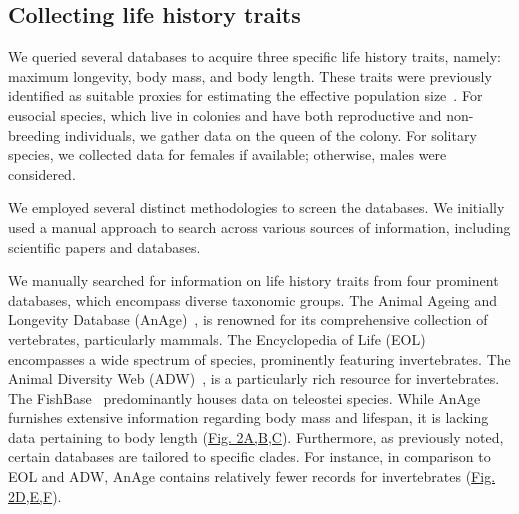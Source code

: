 \subsection{Collecting life history traits}
We queried several databases to acquire three specific life history traits, namely: maximum longevity, body mass, and body length. These traits were previously identified as suitable proxies for estimating the effective population size~\citep{romiguier_comparative_2014, waples_life-history_2016, figuet_life_2016, galtier_adaptive_2016, weyna_relaxation_2020}. For eusocial species, which live in colonies and have both reproductive and non-breeding individuals, we gather data on the queen of the colony. For solitary species, we collected data for females if available; otherwise, males were considered. 

We employed several distinct methodologies to screen the databases.
We initially used a manual approach to search across various sources of information, including scientific papers and databases. 

We manually searched for information on life history traits from four prominent databases, which encompass diverse taxonomic groups. The Animal Ageing and Longevity Database (AnAge)~\citep{tacutu_human_2013}, is renowned for its comprehensive collection of vertebrates, particularly mammals. The Encyclopedia of Life (\acrshort{EOL})~\citep{wilson_encyclopedia_2003, parr_encyclopedia_2014} encompasses a wide spectrum of species, prominently featuring invertebrates. The Animal Diversity Web (\acrshort{ADW})~\citep{myers_animal_2023}, is a particularly rich resource for invertebrates. The FishBase~\citep{froese_fishbase_2023} predominantly houses data on teleostei species. 
While AnAge furnishes extensive information regarding body mass and lifespan, it is lacking data pertaining to body length (\hyperref[fig:gtdrift2]{Fig. 2A,B,C}). Furthermore, as previously noted, certain databases are tailored to specific clades. For instance, in comparison to \acrshort{EOL} and \acrshort{ADW}, AnAge contains relatively fewer records for invertebrates (\hyperref[fig:gtdrift2]{Fig. 2D,E,F}). 

